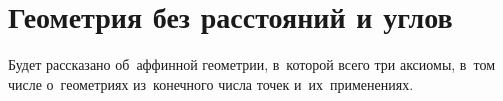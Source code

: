 
\section*{Геометрия без расстояний и углов}



Будет рассказано об~аффинной геометрии, в~которой всего три аксиомы, в~том
числе о~геометриях из~конечного числа точек и~их~применениях.


